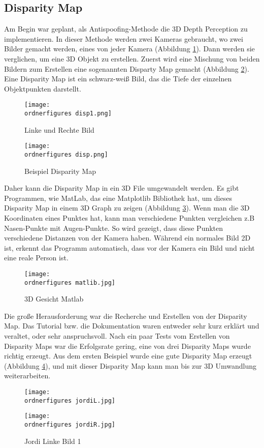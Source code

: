 \subsection{Disparity Map}
Am Begin war geplant, als Antispoofing-Methode die 3D Depth Perception zu implementieren. In dieser Methode werden zwei Kameras gebraucht, wo zwei Bilder gemacht werden, eines von jeder Kamera (Abbildung \ref{fig:bilder1}). Dann werden sie verglichen, um eine 3D Objekt zu erstellen. Zuerst wird eine Mischung von beiden Bildern zum Erstellen eine sogenannten Disparty Map gemacht (Abbildung \ref{fig:dispm1}). Eine Disparity Map ist ein schwarz-weiß Bild, das die Tiefe der einzelnen Objektpunkten darstellt.
\begin{figure}[ht]
  \centering
    \texttt{[image: \\ordnerfigures disp1.png]}
      \caption{Linke und Rechte Bild \cite{disparityM}}
      \label{fig:bilder1}
\end{figure}
\begin{figure}[ht]
  \centering
    \texttt{[image: \\ordnerfigures disp.png]}
      \caption{Beispiel Disparity Map \cite{disparityM}}
      \label{fig:dispm1}
\end{figure}
\bigbreak
Daher kann die Disparity Map in ein 3D File umgewandelt werden. Es gibt Programmen, wie MatLab, das eine Matplotlib Bibliothek hat, um dieses Disparity Map in einem 3D Graph zu zeigen (Abbildung \ref{fig:matlab}). Wenn man die 3D Koordinaten eines Punktes hat, kann man verschiedene Punkten vergleichen z.B Nasen-Punkte mit Augen-Punkte. So wird gezeigt, dass diese Punkten verschiedene Distanzen von der Kamera haben. Während ein normales Bild 2D ist, erkennt das Programm automatisch, dass vor der Kamera ein Bild und nicht eine reale Person ist.
\begin{figure}[ht]
  \centering
    \texttt{[image: \\ordnerfigures matlib.jpg]}
      \caption{3D Gesicht Matlab \cite{matlab}}
      \label{fig:matlab}
\end{figure}
\bigbreak
Die große Herausforderung war die Recherche und Erstellen von der Disparity Map. Das Tutorial bzw. die Dokumentation waren entweder sehr kurz erklärt und veraltet, oder sehr anspruchsvoll. Nach ein paar Tests vom Erstellen von Disparity Maps war die Erfolgsrate gering, eine von drei Disparity Maps wurde  richtig erzeugt.
\bigbreak
\newpage
Aus dem ersten Beispiel wurde eine gute Disparity Map erzeugt (Abbildung \ref{fig:gutdm}), und mit dieser Disparity Map kann man bis zur 3D Umwandlung  weiterarbeiten.
\begin{figure}[!htb]
   \begin{minipage}{0.48\textwidth}
     \centering
     \texttt{[image: \\ordnerfigures jordiL.jpg]}
     \caption{Jordi Linke Bild 1}
     \label{fig:gutdm}
   \end{minipage}\hfill
   \begin{minipage}{0.48\textwidth}
     \centering
     \texttt{[image: \\ordnerfigures jordiR.jpg]}
     \caption{Jordi Linke Bild 1}
   \end{minipage}
\end{figure}
